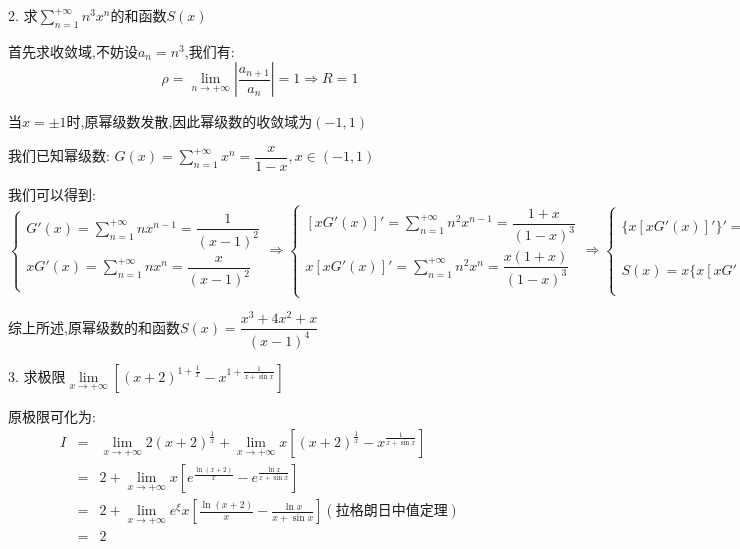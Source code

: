 2. 求$\sum\limits_{n=1}^{+\infty}n^3x^n$的和函数$S(x)$
\begin{solution}

	首先求收敛域,不妨设$a_{n}=n^3$,我们有:  
	$$\rho=\lim\limits_{n\rightarrow +\infty}|\dfrac{a_{n+1}}{a_{n}}|=1\Rightarrow R=1$$
	
	当$x=\pm 1$时,原幂级数发散,因此幂级数的收敛域为$(-1,1)$
	
	我们已知幂级数:  $G(x)=\sum\limits_{n=1}^{+\infty}x^{n}=\dfrac{x}{1-x},x\in(-1,1)$
	
	我们可以得到:  
	$$\left\lbrace
	\begin{array}{l}
		G'(x)=\sum\limits_{n=1}^{+\infty}nx^{n-1}=\dfrac{1}{(x-1)^2}\\
		xG'(x)=\sum\limits_{n=1}^{+\infty}nx^{n}=\dfrac{x}{(x-1)^2}
	\end{array}
	\right.\Rightarrow \left\lbrace
	\begin{array}{l}
		[xG'(x)]'=\sum\limits_{n=1}^{+\infty}n^2x^{n-1}=\dfrac{1+x}{(1-x)^3}\\
		x[xG'(x)]'=\sum\limits_{n=1}^{+\infty}n^2x^{n}=\dfrac{x(1+x)}{(1-x)^3}\\
	\end{array}
	\right.\Rightarrow \left\lbrace
	\begin{array}{l}
		\{x[xG'(x)]'\}'=\sum\limits_{n=1}^{+\infty}n^3x^{n-1}=\dfrac{x^2+4x+1}{(x-1)^4}\\
		S(x)=x\{x[xG'(x)]'\}'=\dfrac{x^3+4x^2+x}{(x-1)^4}
	\end{array}
	\right. $$
	
	综上所述,原幂级数的和函数$S(x)=\dfrac{x^3+4x^2+x}{(x-1)^4}$
\end{solution}

3. 求极限$\lim\limits_{x\rightarrow +\infty}\left[(x+2)^{1+\frac{1}{x}}-x^{1+\frac{1}{x+\sin x}}\right]$
\begin{solution}

	原极限可化为:  
	\begin{eqnarray*}
		I&=&\lim\limits_{x\rightarrow +\infty}2(x+2)^{\frac{1}{x}}+\lim\limits_{x\rightarrow +\infty}x\left[(x+2)^{\frac{1}{x}}-x^{\frac{1}{x+\sin x}}\right]\\
		&=&2+\lim\limits_{x\rightarrow +\infty}x\left[e^{\frac{\ln(x+2)}{x}}-e^{\frac{\ln x}{x+\sin x}}\right]\\
		&=&2+\lim\limits_{x\rightarrow +\infty}e^{\xi}x[\frac{\ln(x+2)}{x}-\frac{\ln x}{x+\sin x}](\text{拉格朗日中值定理})\\
		&=&2
	\end{eqnarray*}
\end{solution}

